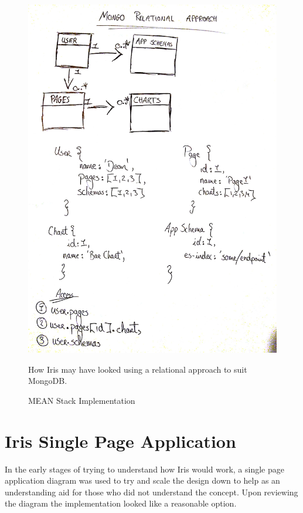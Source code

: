 \documentclass[12pt,a4paper,titlepage]{report}
\begin{document}
\begin{appendices}
\begin{figure}[H]
\begin{tcolorbox}
\centerline{\includegraphics[width=\textwidth]{mongo_relation}}
How Iris may have looked using a relational approach to suit MongoDB.
\end{tcolorbox}
\caption{MEAN Stack Implementation}
\end{figure}

\section{Iris Single Page Application}

In the early stages of trying to understand how Iris would work, a single page application diagram was used to try and scale the design down to help as an understanding aid for those who did not understand the concept. Upon reviewing the diagram the implementation looked like a reasonable option. 


\end{appendices}
\end{document}
